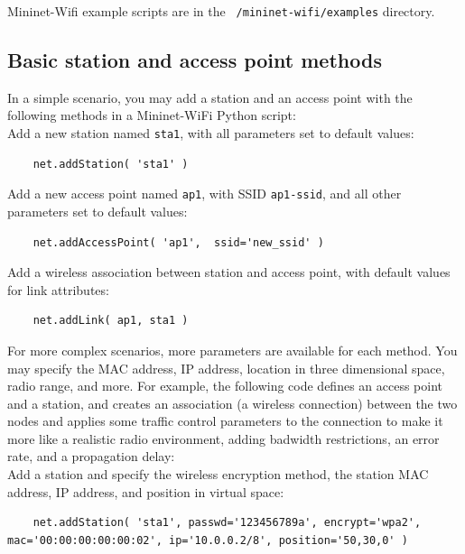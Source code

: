 Mininet-Wifi example scripts are in the \texttt{~/mininet-wifi/examples} directory.

\subsection{Basic station and access point methods}

In a simple scenario, you may add a station and an access point with the following methods in a Mininet-WiFi Python script: \\

\noindent Add a new station named \texttt{sta1}, with all parameters set to default values:

\begin{verbatim}
    net.addStation( 'sta1' )
\end{verbatim}
    

\noindent Add a new access point named \texttt{ap1}, with SSID \texttt{ap1-ssid}, and all other parameters set to default values:
    
\begin{verbatim}
    net.addAccessPoint( 'ap1',  ssid='new_ssid' )
\end{verbatim}

\noindent Add a wireless association between station and access point, with default values for link attributes:

\begin{verbatim}
    net.addLink( ap1, sta1 )
\end{verbatim}
    
\noindent For more complex scenarios, more parameters are available for each method. You may specify the MAC address, IP address, location in three dimensional space, radio range, and more. For example, the following code defines an access point and a station, and creates an association (a wireless connection) between the two nodes and applies some traffic control parameters to the connection to make it more like a realistic radio environment, adding badwidth restrictions, an error rate, and a propagation delay:\\

\noindent Add a station and specify the wireless encryption method, the station MAC address, IP address, and position in virtual space:

\begin{verbatim}
    net.addStation( 'sta1', passwd='123456789a', encrypt='wpa2', mac='00:00:00:00:00:02', ip='10.0.0.2/8', position='50,30,0' ) 
\end{verbatim}
       
